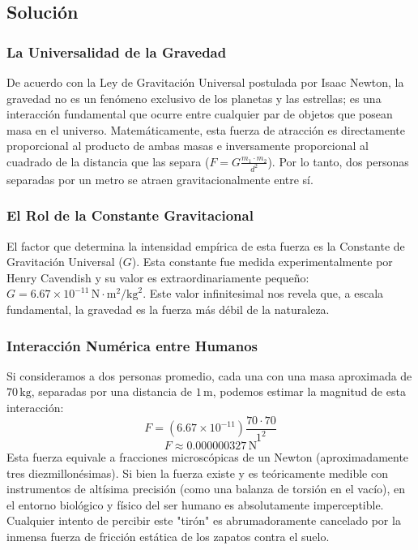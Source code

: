 \documentclass[12pt]{article}
\begin{document}
\subsection*{Solución}

\subsubsection*{La Universalidad de la Gravedad}
De acuerdo con la Ley de Gravitación Universal postulada por Isaac Newton, la gravedad no es un fenómeno exclusivo de los planetas y las estrellas; es una interacción fundamental que ocurre entre cualquier par de objetos que posean masa en el universo. Matemáticamente, esta fuerza de atracción es directamente proporcional al producto de ambas masas e inversamente proporcional al cuadrado de la distancia que las separa ($F = G \frac{m_1 \cdot m_2}{d^2}$). Por lo tanto, dos personas separadas por un metro se atraen gravitacionalmente entre sí.

\subsubsection*{El Rol de la Constante Gravitacional}
El factor que determina la intensidad empírica de esta fuerza es la Constante de Gravitación Universal ($G$). Esta constante fue medida experimentalmente por Henry Cavendish y su valor es extraordinariamente pequeño: $G = 6.67 \times 10^{-11} \, \text{N}\cdot\text{m}^2/\text{kg}^2$. Este valor infinitesimal nos revela que, a escala fundamental, la gravedad es la fuerza más débil de la naturaleza.

\subsubsection*{Interacción Numérica entre Humanos}
Si consideramos a dos personas promedio, cada una con una masa aproximada de $70 \, \text{kg}$, separadas por una distancia de $1 \, \text{m}$, podemos estimar la magnitud de esta interacción:
\begin{equation}
    F = (6.67 \times 10^{-11}) \frac{70 \cdot 70}{1^2}
\end{equation}
\begin{equation}
    F \approx 0.000000327 \, \text{N}
\end{equation}
Esta fuerza equivale a fracciones microscópicas de un Newton (aproximadamente tres diezmillonésimas). Si bien la fuerza existe y es teóricamente medible con instrumentos de altísima precisión (como una balanza de torsión en el vacío), en el entorno biológico y físico del ser humano es absolutamente imperceptible. Cualquier intento de percibir este "tirón" es abrumadoramente cancelado por la inmensa fuerza de fricción estática de los zapatos contra el suelo.
\end{document}

